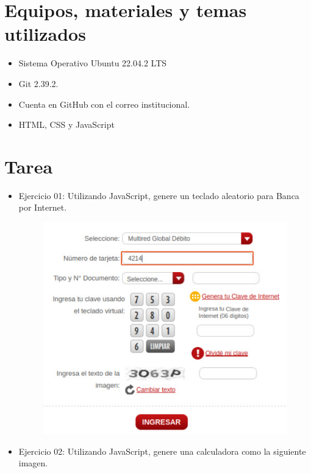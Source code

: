 \documentclass{article}
\begin{document}
\section{Equipos, materiales y temas utilizados}
\begin{itemize}
	\item Sistema Operativo Ubuntu 22.04.2 LTS
	\item Git 2.39.2.
	\item Cuenta en GitHub con el correo institucional.
	\item HTML, CSS y JavaScript
\end{itemize}

\section{Tarea}
\begin{itemize}
	\item Ejercicio 01: Utilizando JavaScript, genere un teclado aleatorio para Banca por Internet.
	\begin{figure}[H]
	    \centering
	    \includegraphics[scale=0.6]{img/banco.png}
	\end{figure}
	\item Ejercicio 02: Utilizando JavaScript, genere una calculadora como la siguiente imagen. 
	\begin{figure}[H]
	    \centering

\end{figure}
\end{itemize}
\end{document}
